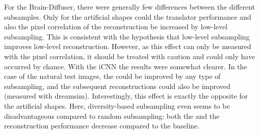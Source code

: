  For the Brain-Diffuser, there were generally few differences between the different subsamples. Only for the artificial shapes could the translator performance and also the pixel correlation of the reconstruction be increased by low-level subsampling. This is consistent with the hypothesis that low-level subsampling improves low-level reconstruction. However, as this effect can only be measured with the pixel correlation, it should be treated with caution and could only have occurred by chance. With the iCNN the results were somewhat clearer. In the case of the natural test images, the  could be improved by any type of subsampling, and the subsequent reconstructions could also be improved (measured with dreamsim). Interestingly, this effect is exactly the opposite for the artificial shapes. Here, diversity-based subsampling even seems to be disadvantageous compared to random subsampling: both the  and the reconstruction performance decrease compared to the baseline. 

